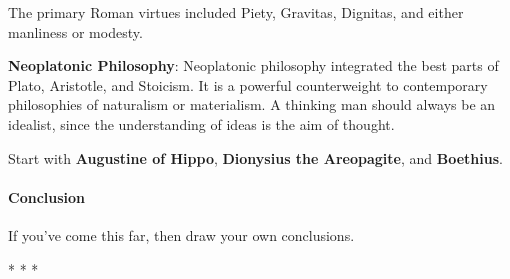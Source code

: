 The primary Roman virtues included Piety, Gravitas, Dignitas, and either manliness or modesty.

\textbf{Neoplatonic Philosophy}: Neoplatonic philosophy integrated the best parts of Plato, Aristotle, and Stoicism. It is a powerful counterweight to contemporary philosophies of naturalism or materialism. A thinking man should always be an idealist, since the understanding of ideas is the aim of thought.

Start with \textbf{Augustine of Hippo}, \textbf{Dionysius the Areopagite}, and \textbf{Boethius}.

\paragraph{Conclusion}
If you've come this far, then draw your own conclusions.




\begin{center}* * *\end{center}

